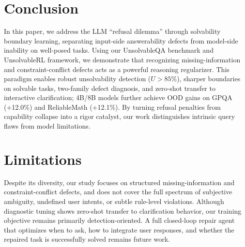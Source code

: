 \section{Conclusion}

In this paper, we address the LLM ``refusal dilemma'' through solvability boundary learning, separating input-side answerability defects from model-side inability on well-posed tasks. Using our UnsolvableQA benchmark and UnsolvableRL framework, we demonstrate that recognizing missing-information and constraint-conflict defects acts as a powerful {reasoning regularizer}. This paradigm enables robust unsolvability detection ($U > 85\%$), sharper boundaries on solvable tasks, two-family defect diagnosis, and zero-shot transfer to interactive clarification; 4B/8B models further achieve OOD gains on GPQA (+12.0\%) and ReliableMath (+12.1\%). By turning refusal penalties from capability collapse into a rigor catalyst, our work distinguishes intrinsic query flaws from model limitations.

\section*{Limitations}
Despite its diversity, our study focuses on structured missing-information and constraint-conflict defects, and does not cover the full spectrum of subjective ambiguity, undefined user intents, or subtle rule-level violations. Although diagnostic tuning shows zero-shot transfer to clarification behavior, our training objective remains primarily detection-oriented. A full closed-loop repair agent that optimizes when to ask, how to integrate user responses, and whether the repaired task is successfully solved remains future work.%
